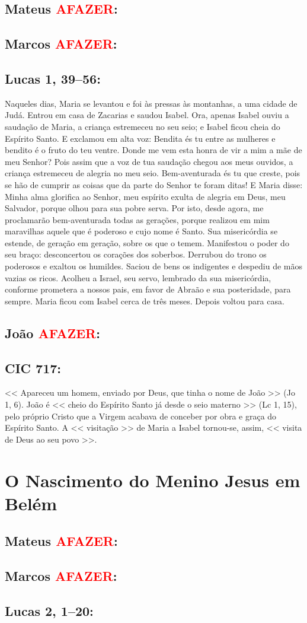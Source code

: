 \documentclass[10pt,a5paper]{book}
\newcommand{\from}[1]{\subsection*{#1}}
\newcommand{\TODO}{\textcolor{red}{\ttfamily AFAZER}}
\begin{document}
\from{Mateus \TODO:}

\from{Marcos \TODO:}

\from{Lucas 1, 39--56:}

Naqueles dias, Maria se levantou e foi às pressas às montanhas, a uma cidade de Judá.
Entrou em casa de Zacarias e saudou Isabel.
Ora, apenas Isabel ouviu a saudação de Maria, a criança estremeceu no seu seio; e Isabel ficou cheia do Espírito Santo.
E exclamou em alta voz: Bendita és tu entre as mulheres e bendito é o fruto do teu ventre.
Donde me vem esta honra de vir a mim a mãe de meu Senhor?
Pois assim que a voz de tua saudação chegou aos meus ouvidos, a criança estremeceu de alegria no meu seio.
Bem-aventurada és tu que creste, pois se hão de cumprir as coisas que da parte do Senhor te foram ditas!
E Maria disse: Minha alma glorifica ao Senhor,
meu espírito exulta de alegria em Deus, meu Salvador,
porque olhou para sua pobre serva. Por isto, desde agora, me proclamarão bem-aventurada todas as gerações,
porque realizou em mim maravilhas aquele que é poderoso e cujo nome é Santo.
Sua misericórdia se estende, de geração em geração, sobre os que o temem.
Manifestou o poder do seu braço: desconcertou os corações dos soberbos.
Derrubou do trono os poderosos e exaltou os humildes.
Saciou de bens os indigentes e despediu de mãos vazias os ricos.
Acolheu a Israel, seu servo, lembrado da sua misericórdia,
conforme prometera a nossos pais, em favor de Abraão e sua posteridade, para sempre.
Maria ficou com Isabel cerca de três meses. Depois voltou para casa.

\from{João \TODO:}

\from{CIC 717:}

<< Apareceu um homem, enviado por Deus, que tinha o nome de João >> (Jo 1, 6).
João é << cheio do Espírito Santo já desde o seio materno >> (Lc 1, 15), pelo próprio Cristo que a Virgem acabava de conceber por obra e graça do Espírito Santo.
A << visitação >> de Maria a Isabel tornou-se, assim, << visita de Deus ao seu povo >>.


\section{O Nascimento do Menino Jesus em Belém}

\from{Mateus \TODO:}

\from{Marcos \TODO:}

\from{Lucas 2, 1--20:}
\end{document}
